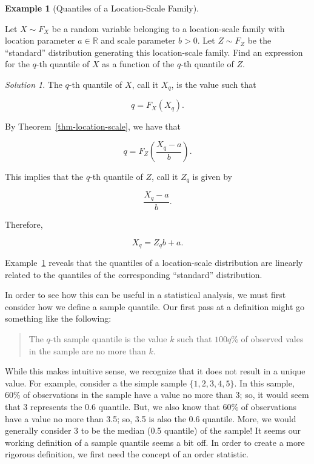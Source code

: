 \documentclass[
  letterpaper,
  DIV=11,
  numbers=noendperiod]{scrreprt}
\theoremstyle{plain}
\theoremstyle{definition}
\theoremstyle{definition}
\newtheorem{example}{Example}[chapter]
\theoremstyle{remark}
\newtheorem*{solution}{Solution}
\begin{document}
\begin{example}[Quantiles of a Location-Scale
Family]\protect\hypertarget{exm-location-scale-quantiles}{}\label{exm-location-scale-quantiles}

Let \(X \sim F_X\) be a random variable belonging to a location-scale
family with location parameter \(a \in \mathbb{R}\) and scale parameter
\(b > 0\). Let \(Z \sim F_Z\) be the ``standard'' distribution
generating this location-scale family. Find an expression for the
\(q\)-th quantile of \(X\) as a function of the \(q\)-th quantile of
\(Z\).

\end{example}

\begin{solution}

The \(q\)-th quantile of \(X\), call it \(X_q\), is the value such that

\[q = F_X\left(X_q\right).\]

By Theorem~\ref{thm-location-scale}, we have that

\[q = F_Z\left(\frac{X_q - a}{b}\right).\]

This implies that the \(q\)-th quantile of \(Z\), call it \(Z_q\) is
given by

\[\frac{X_q - a}{b}.\]

Therefore,

\[X_q = Z_q b + a.\]

\end{solution}

Example~\ref{exm-location-scale-quantiles} reveals that the quantiles of
a location-scale distribution are linearly related to the quantiles of
the corresponding ``standard'' distribution.

In order to see how this can be useful in a statistical analysis, we
must first consider how we define a sample quantile. Our first pass at a
definition might go something like the following:

\begin{quote}
The \(q\)-th sample quantile is the value \(k\) such that \(100q\)\% of
observed vales in the sample are no more than \(k\).
\end{quote}

While this makes intuitive sense, we recognize that it does not result
in a unique value. For example, consider a the simple sample
\(\{1, 2, 3, 4, 5\}\). In this sample, 60\% of observations in the
sample have a value no more than 3; so, it would seem that 3 represents
the 0.6 quantile. But, we also know that 60\% of observations have a
value no more than 3.5; so, 3.5 is also the 0.6 quantile. More, we would
generally consider 3 to be the median (0.5 quantile) of the sample! It
seems our working definition of a sample quantile seems a bit off. In
order to create a more rigorous definition, we first need the concept of
an order statistic.
\end{document}
